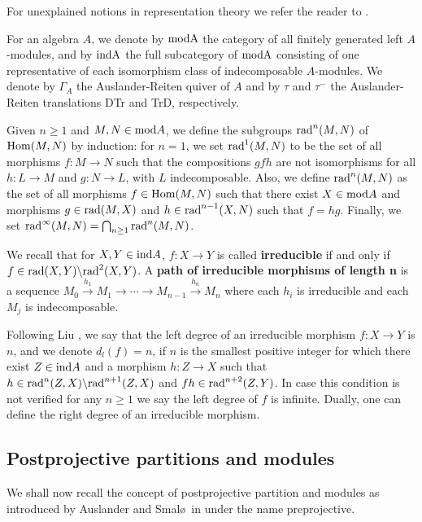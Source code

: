 For unexplained notions in representation theory we refer the reader to \cite{auslanderbook}.

For an algebra $A$, we denote by $\rm{mod}A$ the category of all finitely generated left $A$-modules, and by $\rm{ind}A$ the full subcategory of $\rm{mod}A$ consisting of one representative of each isomorphism class of indecomposable $A$-modules. We denote by $\Gamma_A$ the Auslander-Reiten quiver of $A$ and by $\tau$ and $\tau^{-}$ the Auslander-Reiten translations DTr and TrD, respectively.

Given $n \geq 1$ and  $M,N \in {\rm mod}A$, we define the subgroups ${\rm rad}^n(M,N)$ of ${\rm Hom}(M,N)$ by induction: for $n=1$, we set ${\rm rad}^1(M,N)$ to be the set of all morphisms $f \colon M {\longrightarrow} N$ such that the compositions $gfh$ are not 
isomorphisms for all $h \colon L {\longrightarrow} M$ and $g \colon N {\longrightarrow} L$, with $L$ indecomposable. Also, we define ${\rm rad}^n(M,N)$ as the set of all morphisms $f \in {\rm Hom}(M,N)$ such that there exist $X \in {\rm mod}A$ and morphisms $g \in {\rm rad}(M,X)$ and $h \in {\rm rad}^{n-1}(X,N)$ such that $f=hg$. Finally, we set ${\rm rad}^{\infty}(M,N)= \bigcap_{n \geq 1}{\rm rad}^n(M,N)$.

We recall that for $X,Y \in {\rm ind}A$, $f:X \rightarrow Y$ is called {\bf irreducible} if and only if $f \in {\rm rad}(X,Y) \backslash {\rm rad}^2(X,Y)$. A {\bf path of irreducible morphisms of length n} is a sequence $ M_0 \stackrel{h_1}{\longrightarrow} M_1 {\longrightarrow} \cdots {\longrightarrow} M_{n-1} \stackrel{h_n}{\longrightarrow} M_n$ where each $h_i$ is irreducible and each $M_j$ is indecomposable.

Following Liu \cite{liu}, we say that the left degree of an irreducible morphism $f:X \rightarrow Y$ is $n$, and we denote $d_l(f)=n$, if $n$ is the smallest positive integer for which there exist $Z \in {\rm ind}A$ and a morphism $h : Z \rightarrow X$ such that  $h \in {\rm rad}^n(Z,X) \backslash{\rm rad}^{n+1}(Z,X)$ and $fh \in {\rm rad}^{n+2}(Z,Y)$. In case this condition is not verified for any $n \geq 1$  we say the left degree of $f$ is infinite. Dually, one can define the right degree of an irreducible morphism. 

\subsection{Postprojective partitions and modules} 
We shall now recall the concept of postprojective partition and modules as introduced by Auslander and Smal\o\ in \cite{auslander} under the name preprojective. 

